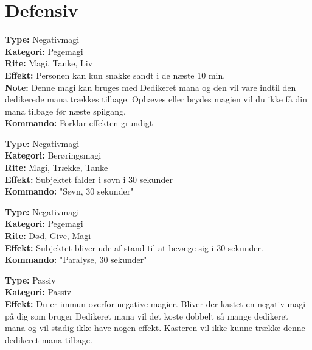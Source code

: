 \section{Defensiv}

\begin{defensiv*}[Sandhed]
\textbf{Type:} Negativmagi\\
\textbf{Kategori:} Pegemagi\\
\textbf{Rite:} Magi, Tanke, Liv\\
\textbf{Effekt:} Personen kan kun snakke sandt i de næste 10 min.\\
\textbf{Note:} Denne magi kan bruges med Dedikeret mana og den vil vare indtil den dedikerede mana trækkes tilbage. Ophæves eller brydes magien vil du ikke få din mana tilbage før næste spilgang.\\
\textbf{Kommando:} Forklar effekten grundigt\\
\end{defensiv*}

\begin{defensiv*}[Søvn]
\textbf{Type:} Negativmagi\\
\textbf{Kategori:} Berøringsmagi\\
\textbf{Rite:} Magi, Trække, Tanke\\
\textbf{Effekt:} Subjektet falder i søvn i 30 sekunder\\
\textbf{Kommando:} "Søvn, 30 sekunder"\\
\end{defensiv*}

\begin{defensiv*}[Paralyse]
\textbf{Type:} Negativmagi\\
\textbf{Kategori:} Pegemagi\\
\textbf{Rite:} Død, Give, Magi\\
\textbf{Effekt:} Subjektet bliver ude af stand til at bevæge sig i 30 sekunder.\\
\textbf{Kommando:} "Paralyse, 30 sekunder"\\
\end{defensiv*}

\begin{defensiv*}
\textbf{Type:} Passiv\\
\textbf{Kategori:} Passiv\\
\textbf{Effekt:} Du er immun overfor negative magier. Bliver der kastet en negativ magi på dig som bruger Dedikeret mana vil det koste dobbelt så mange dedikeret mana og vil stadig ikke have nogen effekt. Kasteren vil ikke kunne trække denne dedikeret mana tilbage.
\end{defensiv*}

